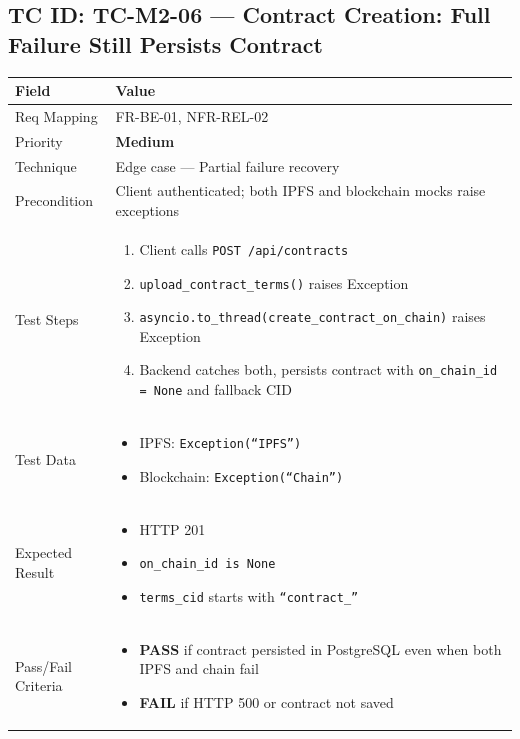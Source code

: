 \documentclass[12pt,a4paper]{article}
\newcommand{\sevmed}{\textcolor{severitymed}{\textbf{Medium}}}
\newcommand{\passresult}{\textcolor{passgreen}{\textbf{PASS}}}
\newcommand{\failresult}{\textcolor{failred}{\textbf{FAIL}}}
\begin{document}
\vspace{0.8cm}

\subsection{TC ID: TC-M2-06 --- Contract Creation: Full Failure Still Persists Contract}

\begin{tabular}{|p{}|p{}|}
\hline
\rowcolor{lightblue} \textbf{Field} & \textbf{Value} \\
\hline
Req Mapping & FR-BE-01, NFR-REL-02 \\
\hline
Priority & \sevmed \\
\hline
Technique & Edge case --- Partial failure recovery \\
\hline
Precondition & Client authenticated; both IPFS and blockchain mocks raise exceptions \\
\hline
Test Steps &
\begin{enumerate}[nosep, leftmargin=*]
  \item Client calls \texttt{POST /api/contracts}
  \item \texttt{upload\_contract\_terms()} raises Exception
  \item \texttt{asyncio.to\_thread(create\_contract\_on\_chain)} raises Exception
  \item Backend catches both, persists contract with \texttt{on\_chain\_id = None} and fallback CID
\end{enumerate} \\
\hline
Test Data &
\begin{itemize}[nosep, leftmargin=*]
  \item IPFS: \texttt{Exception(``IPFS'')}
  \item Blockchain: \texttt{Exception(``Chain'')}
\end{itemize} \\
\hline
Expected Result &
\begin{itemize}[nosep, leftmargin=*]
  \item HTTP 201
  \item \texttt{on\_chain\_id is None}
  \item \texttt{terms\_cid} starts with \texttt{``contract\_''}
\end{itemize} \\
\hline
Pass/Fail Criteria &
\begin{itemize}[nosep, leftmargin=*]
  \item \passresult{} if contract persisted in PostgreSQL even when both IPFS and chain fail
  \item \failresult{} if HTTP 500 or contract not saved
\end{itemize} \\
\hline
\end{tabular}
\end{document}
